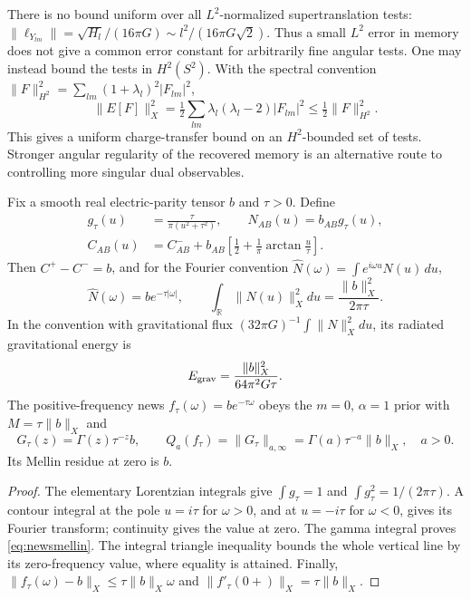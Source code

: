There is no bound uniform over all $L^2$-normalized supertranslation
tests: $\|\ell_{Y_{lm}}\|=\sqrt{H_l}/(16\pi G)
\sim l^2/(16\pi G\sqrt2)$.
Thus a small $L^2$ error in memory does not give a common error constant
for arbitrarily fine angular tests. One may instead bound the tests
in $H^2(S^2)$. With the spectral convention
$\|F\|_{H^2}^2=\sum_{lm}(1+\lambda_l)^2|F_{lm}|^2$,
\[
 \|E[F]\|_X^2=\tfrac12\sum_{lm}\lambda_l(\lambda_l-2)|F_{lm}|^2
 \le\tfrac12\|F\|_{H^2}^2.
\]
This gives a uniform charge-transfer bound on an $H^2$-bounded set
of tests. Stronger angular regularity of the recovered memory is an
alternative route to controlling more singular dual observables.

\begin{proposition}\label{prop:lorentziannews}
Fix a smooth real electric-parity tensor $b$ and $\tau>0$. Define
\begin{align}
 g_\tau(u)&=\frac{\tau}{\pi(u^2+\tau^2)},\qquad
 N_{AB}(u)=b_{AB}g_\tau(u),\label{eq:lorentziannews}\\
 C_{AB}(u)&=C^-_{AB}+b_{AB}
 \left[\frac12+\frac1\pi\arctan\frac u\tau\right].
\end{align}
Then $C^+-C^-=b$, and for the Fourier convention
$\widehat N(\omega)=\int e^{i\omega u}N(u)\,du$,
\begin{equation}\label{eq:newsfourier}
 \widehat N(\omega)=b e^{-\tau|\omega|},\qquad
 \int_{\mathbb R}\|N(u)\|_X^2du=\frac{\|b\|_X^2}{2\pi\tau}.
\end{equation}
In the convention with gravitational flux
$(32\pi G)^{-1}\int\|N\|_X^2du$, its radiated gravitational energy is
\begin{equation}\label{eq:radiatedenergy}
 E_{\rm grav}=\frac{\|b\|_X^2}{64\pi^2G\tau}.
\end{equation}
The positive-frequency news $f_\tau(\omega)=b e^{-\tau\omega}$ obeys
the $m=0$, $\alpha=1$ prior with $M=\tau\|b\|_X$ and
\begin{equation}\label{eq:newsmellin}
 G_\tau(z)=\Gamma(z)\tau^{-z}b,\qquad
 Q_a(f_\tau)=\|G_\tau\|_{a,\infty}
 =\Gamma(a)\tau^{-a}\|b\|_X,\quad a>0.
\end{equation}
Its Mellin residue at zero is $b$.
\end{proposition}
\begin{proof}
The elementary Lorentzian integrals give $\int g_\tau=1$ and
$\int g_\tau^2=1/(2\pi\tau)$. A contour integral at the pole
$u=i\tau$ for $\omega>0$, and at $u=-i\tau$ for $\omega<0$,
gives its Fourier transform; continuity gives the value at zero.
The gamma integral proves \eqref{eq:newsmellin}. The integral
triangle inequality bounds the whole vertical line by its zero-frequency
value, where equality is attained. Finally,
$\|f_\tau(\omega)-b\|_X
\le\tau\|b\|_X\omega$ and
$\|f'_\tau(0+)\|_X=\tau\|b\|_X$.
\end{proof}

